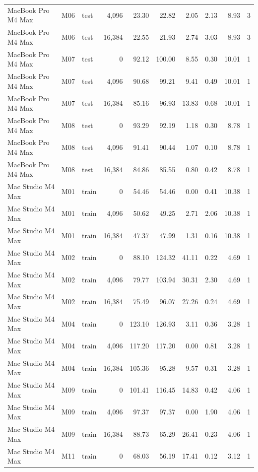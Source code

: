 \documentclass[10pt]{article}
\begin{document}
\begin{landscape}
\begin{longtable}{@{}l l l r r r r r r r@{}}
MacBook Pro M4 Max & M06 & test & 4,096 & 23.30 & 22.82 & 2.05 & 2.13 & 8.93 & 3 \\
MacBook Pro M4 Max & M06 & test & 16,384 & 22.55 & 21.93 & 2.74 & 3.03 & 8.93 & 3 \\
MacBook Pro M4 Max & M07 & test & 0 & 92.12 & 100.00 & 8.55 & 0.30 & 10.01 & 1 \\
MacBook Pro M4 Max & M07 & test & 4,096 & 90.68 & 99.21 & 9.41 & 0.49 & 10.01 & 1 \\
MacBook Pro M4 Max & M07 & test & 16,384 & 85.16 & 96.93 & 13.83 & 0.68 & 10.01 & 1 \\
MacBook Pro M4 Max & M08 & test & 0 & 93.29 & 92.19 & 1.18 & 0.30 & 8.78 & 1 \\
MacBook Pro M4 Max & M08 & test & 4,096 & 91.41 & 90.44 & 1.07 & 0.10 & 8.78 & 1 \\
MacBook Pro M4 Max & M08 & test & 16,384 & 84.86 & 85.55 & 0.80 & 0.42 & 8.78 & 1 \\
Mac Studio M4 Max & M01 & train & 0 & 54.46 & 54.46 & 0.00 & 0.41 & 10.38 & 1 \\
Mac Studio M4 Max & M01 & train & 4,096 & 50.62 & 49.25 & 2.71 & 2.06 & 10.38 & 1 \\
Mac Studio M4 Max & M01 & train & 16,384 & 47.37 & 47.99 & 1.31 & 0.16 & 10.38 & 1 \\
Mac Studio M4 Max & M02 & train & 0 & 88.10 & 124.32 & 41.11 & 0.22 & 4.69 & 1 \\
Mac Studio M4 Max & M02 & train & 4,096 & 79.77 & 103.94 & 30.31 & 2.30 & 4.69 & 1 \\
Mac Studio M4 Max & M02 & train & 16,384 & 75.49 & 96.07 & 27.26 & 0.24 & 4.69 & 1 \\
Mac Studio M4 Max & M04 & train & 0 & 123.10 & 126.93 & 3.11 & 0.36 & 3.28 & 1 \\
Mac Studio M4 Max & M04 & train & 4,096 & 117.20 & 117.20 & 0.00 & 0.81 & 3.28 & 1 \\
Mac Studio M4 Max & M04 & train & 16,384 & 105.36 & 95.28 & 9.57 & 0.31 & 3.28 & 1 \\
Mac Studio M4 Max & M09 & train & 0 & 101.41 & 116.45 & 14.83 & 0.42 & 4.06 & 1 \\
Mac Studio M4 Max & M09 & train & 4,096 & 97.37 & 97.37 & 0.00 & 1.90 & 4.06 & 1 \\
Mac Studio M4 Max & M09 & train & 16,384 & 88.73 & 65.29 & 26.41 & 0.23 & 4.06 & 1 \\
Mac Studio M4 Max & M11 & train & 0 & 68.03 & 56.19 & 17.41 & 0.12 & 3.12 & 1 \\

\end{longtable}
\end{landscape}
\end{document}

